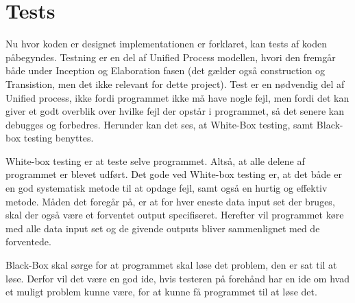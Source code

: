 \chapter{Tests}\label{ch:tests}
Nu hvor koden er designet implementationen er forklaret, kan tests af koden påbegyndes. Testning er en del af Unified Process modellen, hvori den fremgår både under Inception og Elaboration fasen (det gælder også construction og Transistion, men det ikke relevant for dette project)\cite{UP}. Test er en nødvendig del af Unified process, ikke fordi programmet ikke må have nogle fejl, men fordi det kan giver et godt overblik over hvilke fejl der opstår i programmet, så det senere kan debugges og forbedres\cite{sestoft2008systematic}. Herunder kan det ses, at White-Box testing, samt Black-box testing benyttes. 

White-box testing er at teste selve programmet. Altså, at alle delene af programmet er blevet udført. Det gode ved White-box testing er, at det både er en god systematisk metode til at opdage fejl, samt også en hurtig og effektiv metode. Måden det foregår på, er at for hver eneste data input set der bruges, skal der også være et forventet output specifiseret. Herefter vil programmet køre med alle data input set og de givende outputs bliver sammenlignet med de forventede\cite{sestoft2008systematic}.

Black-Box skal sørge for at programmet skal løse det problem, den er sat til at løse. Derfor vil det være en god ide, hvis testeren på forehånd har en ide om hvad et muligt problem kunne være, for at kunne få programmet til at løse det\cite{sestoft2008systematic}. 
